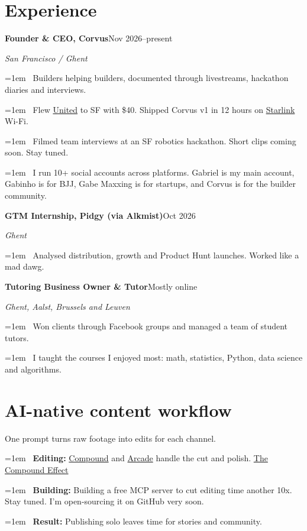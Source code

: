 \documentclass[letterpaper,11pt]{article}
\begin{document}
\section{Experience}
\smallskip\textbf{Founder \& CEO, Corvus}\hfill Nov 2026–present\par
\textit{San Francisco / Ghent}\par
\hangindent=1em \textbullet\ Builders helping builders, documented through livestreams, hackathon diaries and interviews.\par
\hangindent=1em \textbullet\ Flew \href{https://www.united.com/}{United} to SF with \$40. Shipped Corvus v1 in 12 hours on \href{https://www.starlink.com/}{Starlink} Wi-Fi.\par
\hangindent=1em \textbullet\ Filmed team interviews at an SF robotics hackathon. Short clips coming soon. Stay tuned.\par
\hangindent=1em \textbullet\ I run 10+ social accounts across platforms. Gabriel is my main account, Gabinho is for BJJ, Gabe Maxxing is for startups, and Corvus is for the builder community.\par
\smallskip\textbf{GTM Internship, Pidgy (via Alkmist)}\hfill Oct 2026\par
\textit{Ghent}\par
\hangindent=1em \textbullet\ Analysed distribution, growth and Product Hunt launches. Worked like a mad dawg.\par
\smallskip\textbf{Tutoring Business Owner \& Tutor}\hfill Mostly online\par
\textit{Ghent, Aalst, Brussels and Leuven}\par
\hangindent=1em \textbullet\ Won clients through Facebook groups and managed a team of student tutors.\par
\hangindent=1em \textbullet\ I taught the courses I enjoyed most: math, statistics, Python, data science and algorithms.\par
\section{AI-native content workflow}
One prompt turns raw footage into edits for each channel.\par
\hangindent=1em \textbullet\ \textbf{Editing:} \href{https://corvus.gent/go/compound-impact}{Compound} and \href{https://www.arcade.software/}{Arcade} handle the cut and polish. \href{https://corvus.gent/compound/impact/}{The Compound Effect }\par
\hangindent=1em \textbullet\ \textbf{Building:} Building a free MCP server to cut editing time another 10x. Stay tuned. I'm open-sourcing it on GitHub very soon.\par
\hangindent=1em \textbullet\ \textbf{Result:} Publishing solo leaves time for stories and community.\par
\end{document}
